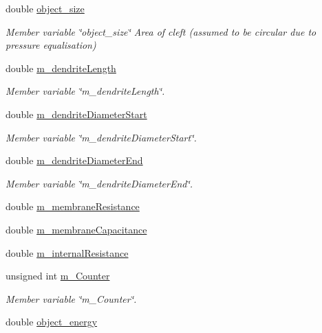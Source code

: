 \begin{DoxyCompactItemize}
\item 
double \mbox{\hyperlink{classDendriteCleft_ac78e2502c53c1b3d0c2a759f3b653dde}{object\+\_\+size}}
\begin{DoxyCompactList}\small\item\em Member variable \char`\"{}object\+\_\+size\char`\"{} Area of cleft (assumed to be circular due to pressure equalisation) \end{DoxyCompactList}\item 
double \mbox{\hyperlink{classDendriteCleft_ae24f44df5148f9bcf95ba4a2a1916491}{m\+\_\+dendrite\+Length}}
\begin{DoxyCompactList}\small\item\em Member variable \char`\"{}m\+\_\+dendrite\+Length\char`\"{}. \end{DoxyCompactList}\item 
double \mbox{\hyperlink{classDendriteCleft_ad206cd42f8bf36b989e3993d02214e12}{m\+\_\+dendrite\+Diameter\+Start}}
\begin{DoxyCompactList}\small\item\em Member variable \char`\"{}m\+\_\+dendrite\+Diameter\+Start\char`\"{}. \end{DoxyCompactList}\item 
double \mbox{\hyperlink{classDendriteCleft_aa905ee6ba625bfa340282b03b916ecdf}{m\+\_\+dendrite\+Diameter\+End}}
\begin{DoxyCompactList}\small\item\em Member variable \char`\"{}m\+\_\+dendrite\+Diameter\+End\char`\"{}. \end{DoxyCompactList}\item 
double \mbox{\hyperlink{classDendriteCleft_aed8f88f66a419600c41da62d8814dc59}{m\+\_\+membrane\+Resistance}}
\item 
double \mbox{\hyperlink{classDendriteCleft_ab5a89436993650294a6abab92852f488}{m\+\_\+membrane\+Capacitance}}
\item 
double \mbox{\hyperlink{classDendriteCleft_ad947e5dda845fb5ac25cfb3709a4e860}{m\+\_\+internal\+Resistance}}
\item 
unsigned int \mbox{\hyperlink{classDendriteCleft_a9244fcddd66073866759b5bedca083db}{m\+\_\+\+Counter}}
\begin{DoxyCompactList}\small\item\em Member variable \char`\"{}m\+\_\+\+Counter\char`\"{}. \end{DoxyCompactList}\item 
double \mbox{\hyperlink{classDendriteCleft_a22c6048147877a2c59c9264b295e7179}{object\+\_\+energy}}

\end{DoxyCompactItemize}

